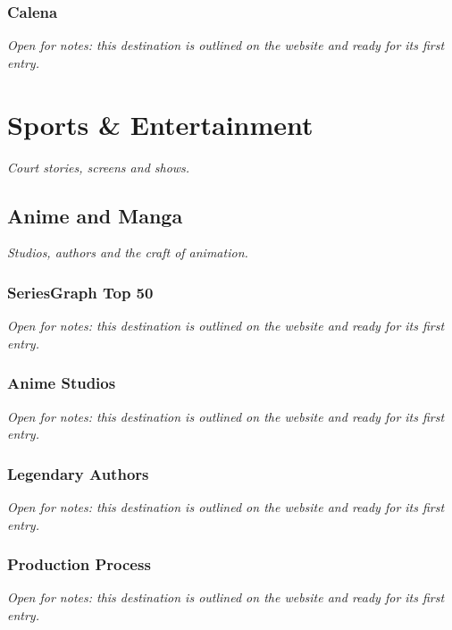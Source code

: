 \documentclass{article}
\begin{document}
\newpage

\subsubsection{Calena}\label{sec:calena}
\textit{Open for notes: this destination is outlined on the website and ready for its first entry.}

\section{Sports \& Entertainment}\label{sec:sports-and-entertainment}
\textit{Court stories, screens and shows.}

\subsection{Anime and Manga}\label{sec:anime-and-manga}
\textit{Studios, authors and the craft of animation.}

\subsubsection{SeriesGraph Top 50}\label{sec:anime-and-manga-seriesgraph-top-50}
\textit{Open for notes: this destination is outlined on the website and ready for its first entry.}

\subsubsection{Anime Studios}\label{sec:anime-studios}
\textit{Open for notes: this destination is outlined on the website and ready for its first entry.}

\subsubsection{Legendary Authors}\label{sec:legendary-authors}
\textit{Open for notes: this destination is outlined on the website and ready for its first entry.}

\subsubsection{Production Process}\label{sec:anime-and-manga-production-process}
\textit{Open for notes: this destination is outlined on the website and ready for its first entry.}
\end{document}
